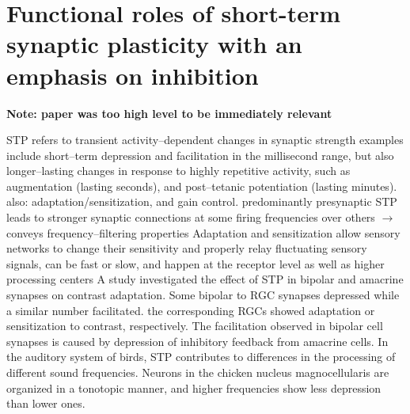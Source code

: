 \documentclass[11pt, a4paper, oneside]{article}   	%
\begin{document}

\section{Functional roles of short-term synaptic plasticity with an emphasis on inhibition \cite{Anwar2017}}


\textbf{Note: paper was too high level to be immediately relevant}

\begin{outline}
    \point STP refers to transient activity--dependent changes in synaptic strength
        \subpoint examples include short--term depression and facilitation in the millisecond range, but also longer--lasting changes in response to highly repetitive activity, such as augmentation (lasting seconds), and post--tetanic potentiation (lasting minutes).
        \subpoint also: adaptation/sensitization, and gain control.
    \point predominantly presynaptic
        \subpoint STP leads to stronger synaptic connections at some firing frequencies over others $\rightarrow$ conveys frequency--filtering properties
    \point Adaptation and sensitization allow sensory networks to change their sensitivity and properly relay fluctuating sensory signals, can be fast or slow, and happen at the receptor level as well as higher processing centers
        \subpoint A study investigated the effect of STP in bipolar and amacrine synapses on contrast adaptation. Some bipolar to RGC synapses depressed while a similar number facilitated. the corresponding RGCs showed adaptation or sensitization to contrast, respectively. The facilitation observed in bipolar cell synapses is caused by depression of inhibitory feedback from amacrine cells. 
    \point In the auditory system of birds, STP contributes to differences in the processing of different sound frequencies. Neurons in the chicken nucleus magnocellularis are organized in a tonotopic manner, and higher frequencies show less depression than lower ones. 
  
\end{outline}

\end{document}
